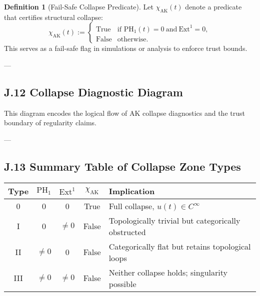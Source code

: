 \documentclass[11pt]{article}
\theoremstyle{definition}
\newtheorem{definition}[theorem]{Definition}
\begin{document}
\begin{definition}[Fail-Safe Collapse Predicate]
Let $\chi_{\text{AK}}(t)$ denote a predicate that certifies structural collapse:
\[
\chi_{\text{AK}}(t) := 
\begin{cases}
\text{True} & \text{if } \mathrm{PH}_1(t) = 0 \ \text{and} \ \mathrm{Ext}^1 = 0, \\
\text{False} & \text{otherwise}.
\end{cases}
\]
This serves as a fail-safe flag in simulations or analysis to enforce trust bounds.
\end{definition}

---

\subsection*{J.12 Collapse Diagnostic Diagram}

\begin{center}
\end{center}

This diagram encodes the logical flow of AK collapse diagnostics and the trust boundary of regularity claims.

---

\subsection*{J.13 Summary Table of Collapse Zone Types}

\begin{center}
\renewcommand{\arraystretch}{1.3}
\begin{tabular}{|c|c|c|c|l|}
\hline
\textbf{Type} & $\mathrm{PH}_1$ & $\mathrm{Ext}^1$ & $\chi_{\text{AK}}$ & \textbf{Implication} \\
\hline
0 & 0 & 0 & True & Full collapse, $u(t) \in C^\infty$ \\
I & 0 & $\neq 0$ & False & Topologically trivial but categorically obstructed \\
II & $\neq 0$ & 0 & False & Categorically flat but retains topological loops \\
III & $\neq 0$ & $\neq 0$ & False & Neither collapse holds; singularity possible \\
\hline
\end{tabular}
\end{center}
\end{document}
